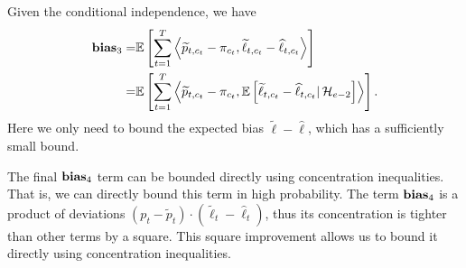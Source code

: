 Given the conditional independence, we have
\begin{align*}
    \mathbf{bias}_{3} =&\mathbb{E}\left[\sum_{t=1}^T \left\langle \widetilde{p}_{t, c_t}-\pi_{c_t}, \widetilde{\ell}_{t, c_t}-\widehat{\ell}_{t, c_t} \right\rangle\right] \\
    =& \mathbb{E}\left[\sum_{t=1}^T \left\langle \widetilde{p}_{t, c_t}-\pi_{c_t}, \mathbb{E}\left[\widetilde{\ell}_{t, c_t}-\widehat{\ell}_{t, c_t} | \operatorname{\mathcal{H}}_{e-2} \right] \right\rangle\right].
\end{align*}
Here we only need to bound the expected bias $\widetilde{\ell} - \widehat{\ell}$, which has a sufficiently small bound. 

The final $\mathbf{bias}_{4}$ term can be bounded directly using concentration inequalities. That is, we can directly bound this term in high probability. The term $\mathbf{bias}_{4}$ is a product of deviations $\left(p_{t} - \widetilde{p}_t\right) \cdot \left( \widetilde{\ell}_t - \widehat{\ell}_t\right)$, thus its concentration is tighter than other terms by a square. This square improvement allows us to bound it directly using concentration inequalities.
